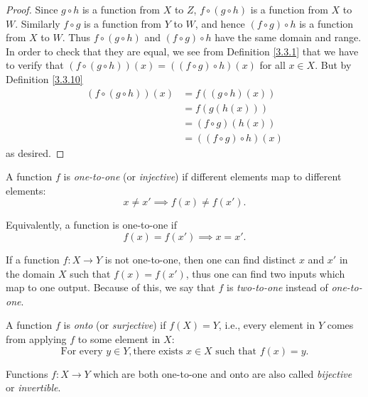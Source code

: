 \begin{proof}
Since \(g \circ h\) is a function from \(X\) to \(Z\), \(f \circ (g \circ h)\) is a function from \(X\) to \(W\).
Similarly \(f \circ g\) is a function from \(Y\) to \(W\), and hence \((f \circ g) \circ h\) is a function from \(X\) to \(W\).
Thus \(f \circ (g \circ h)\) and \((f \circ g) \circ h\) have the same domain and range.
In order to check that they are equal, we see from Definition \ref{3.3.1} that we have to verify that \((f \circ (g \circ h))(x) = ((f \circ g) \circ h)(x)\) for all \(x \in X\).
But by Definition \ref{3.3.10}
    \begin{align*}
        (f \circ (g \circ h))(x)
        &= f((g \circ h)(x)) \\
        &= f(g(h(x))) \\
        &= (f \circ g)(h(x)) \\
        &= ((f \circ g) \circ h)(x)
    \end{align*}
as desired.
\end{proof}

\setcounter{theorem}{13}
\begin{definition}\label{3.3.14}
A function \(f\) is \emph{one-to-one} (or \emph{injective}) if different elements map to different elements:
\[
    x \neq x' \implies f(x) \neq f(x').
\]

Equivalently, a function is one-to-one if
\[
    f(x) = f(x') \implies x = x'.
\]
\end{definition}

\setcounter{theorem}{15}
\begin{remark}\label{3.3.16}
If a function \(f : X \to Y\) is not one-to-one, then one can find distinct \(x\) and \(x'\) in the domain \(X\) such that \(f(x) = f(x')\), thus one can find two inputs which map to one output.
Because of this, we say that \(f\) is \emph{two-to-one} instead of \emph{one-to-one}.
\end{remark}

\begin{definition}\label{3.3.17}
A function \(f\) is \emph{onto} (or \emph{surjective}) if \(f(X) = Y\), i.e., every element in \(Y\) comes from applying \(f\) to some element in \(X\):
\[
    \text{For every } y \in Y, \text{there exists } x \in X \text{ such that } f(x) = y.
\]
\end{definition}

\setcounter{theorem}{19}
\begin{definition}\label{3.3.20}
Functions \(f : X \to Y\) which are both one-to-one and onto are also called \emph{bijective} or \emph{invertible}.
\end{definition}

